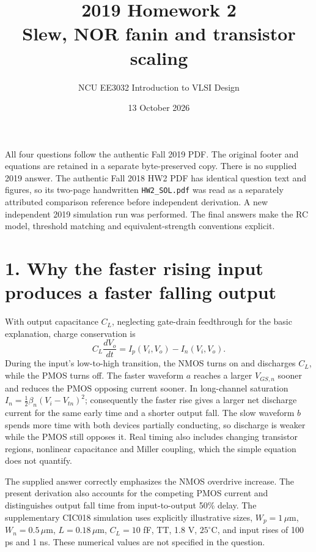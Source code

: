 \documentclass[11pt,a4paper]{article}
\title{2019 Homework 2\\Slew, NOR fanin and transistor scaling}
\author{NCU EE3032 Introduction to VLSI Design}\date{13 October 2026}
\newcommand{\VDD}{V_{\mathrm{DD}}}
\begin{document}
\maketitle
All four questions follow the authentic Fall 2019 PDF. The original footer
and equations are retained in a separate byte-preserved copy. There is no
supplied 2019 answer. The authentic Fall 2018 HW2 PDF has identical question
text and figures, so its two-page handwritten \texttt{HW2\_SOL.pdf} was read
as a separately attributed comparison reference before independent derivation.
A new independent 2019 simulation run was performed.
The final answers make the RC model, threshold matching and
equivalent-strength conventions explicit.

\section*{1. Why the faster rising input produces a faster falling output}
With output capacitance $C_L$, neglecting gate-drain feedthrough for the
basic explanation, charge conservation is
\[
 C_L\frac{dV_o}{dt}=I_p(V_i,V_o)-I_n(V_i,V_o).
\]
During the input's low-to-high transition, the NMOS turns on and discharges
$C_L$, while the PMOS turns off. The faster waveform $a$ reaches a larger
$V_{GS,n}$ sooner and reduces the PMOS opposing current sooner.
In long-channel saturation $I_n=\frac12\beta_n(V_i-V_{tn})^2$; consequently
the faster rise gives a larger net discharge current for the same early time
and a shorter output fall. The slow waveform $b$ spends more time with both
devices partially conducting, so discharge is weaker while the PMOS still
opposes it. Real timing also includes changing transistor regions, nonlinear
capacitance and Miller coupling, which the simple equation does not quantify.

\begin{center}\end{center}
The supplied answer correctly emphasizes the NMOS overdrive increase.
The present derivation also accounts for the competing PMOS current and
distinguishes output fall time from input-to-output 50\% delay.
The supplementary CIC018 simulation uses explicitly illustrative sizes,
$W_p=1\,\mu$m, $W_n=0.5\,\mu$m, $L=0.18\,\mu$m, $C_L=10$ fF,
TT, 1.8 V, $25^\circ$C, and input rises of 100 ps and 1 ns.
These numerical values are not specified in the question.
\end{document}
